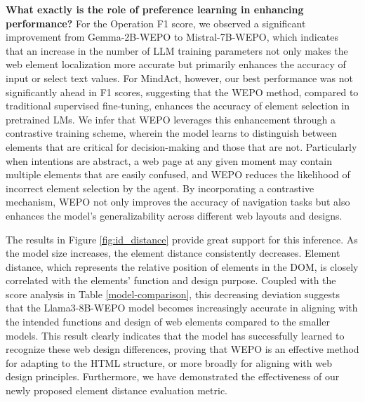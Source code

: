 \documentclass{article}
\begin{document}
  \textbf{What exactly is the role of preference learning in enhancing performance?} For the Operation F1 score, we observed a significant improvement from Gemma-2B-WEPO to Mistral-7B-WEPO, which indicates that an increase in the number of LLM training parameters not only makes the web element localization more accurate but primarily enhances the accuracy of input or select text values. For MindAct, however, our best performance was not significantly ahead in F1 scores, suggesting that the WEPO method, compared to traditional supervised fine-tuning, enhances the accuracy of element selection in pretrained LMs. We infer that WEPO leverages this enhancement through a contrastive training scheme, wherein the model learns to distinguish between elements that are critical for decision-making and those that are not. Particularly when intentions are abstract, a web page at any given moment may contain multiple elements that are easily confused, and WEPO reduces the likelihood of incorrect element selection by the agent. By incorporating a contrastive mechanism, WEPO not only improves the accuracy of navigation tasks but also enhances the model’s generalizability across different web layouts and designs. 
  
  The results in Figure \ref{fig:id_distance} provide great support for this inference. As the model size increases, the element distance consistently decreases. Element distance, which represents the relative position of elements in the DOM, is closely correlated with the elements' function and design purpose. Coupled with the score analysis in Table \ref{model-comparison}, this decreasing deviation suggests that the Llama3-8B-WEPO model becomes increasingly accurate in aligning with the intended functions and design of web elements compared to the smaller models. This result clearly indicates that the model has successfully learned to recognize these web design differences, proving that WEPO is an effective method for adapting to the HTML structure, or more broadly for aligning with web design principles. Furthermore, we have demonstrated the effectiveness of our newly proposed element distance evaluation metric.
  
\end{document}
